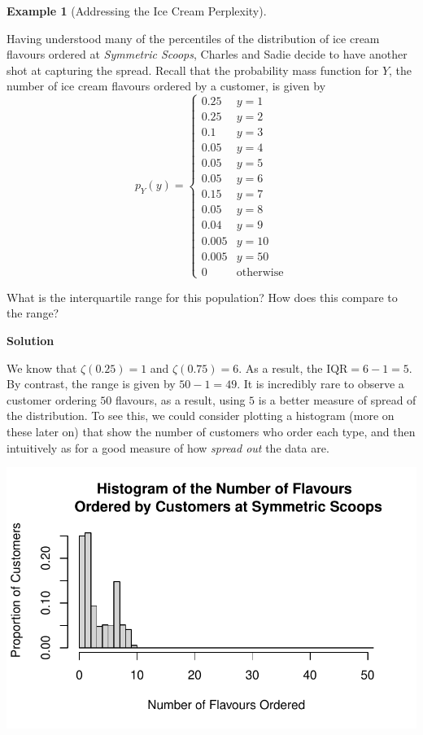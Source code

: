 \documentclass[
  letterpaper,
  DIV=11,
  numbers=noendperiod]{scrreprt}
\theoremstyle{definition}
\theoremstyle{definition}
\newtheorem{example}{Example}[chapter]
\theoremstyle{definition}
\theoremstyle{remark}
\begin{document}
\begin{example}[Addressing the Ice Cream
Perplexity]\protect\hypertarget{exm-percentile}{}\label{exm-percentile}

Having understood many of the percentiles of the distribution of ice
cream flavours ordered at \emph{Symmetric Scoops}, Charles and Sadie
decide to have another shot at capturing the spread. Recall that the
probability mass function for \(Y\), the number of ice cream flavours
ordered by a customer, is given by \[
p_Y(y) = \begin{cases} 
0.25 & y = 1 \\
0.25 & y = 2 \\
0.1 & y = 3 \\
0.05 & y = 4 \\
0.05 & y = 5 \\
0.05 & y = 6 \\
0.15 & y = 7 \\
0.05 & y = 8 \\
0.04 & y = 9 \\
0.005 & y = 10 \\ 
0.005 & y = 50 \\
0 & \text{otherwise}
\end{cases}
\]

What is the interquartile range for this population? How does this
compare to the range?

\begin{tcolorbox}[enhanced jigsaw, colback=white, colframe=quarto-callout-color-frame, arc=.35mm, leftrule=.75mm, rightrule=.15mm, opacityback=0, breakable, bottomrule=.15mm, left=2mm, toprule=.15mm]

\vspace{-3mm}\textbf{Solution}\vspace{3mm}

We know that \(\zeta(0.25) = 1\) and \(\zeta(0.75) = 6\). As a result,
the \(\text{IQR} = 6 - 1 = 5\). By contrast, the range is given by
\(50 - 1 = 49\). It is incredibly rare to observe a customer ordering
\(50\) flavours, as a result, using \(5\) is a better measure of spread
of the distribution. To see this, we could consider plotting a histogram
(more on these later on) that show the number of customers who order
each type, and then intuitively as for a good measure of how
\emph{spread out} the data are.

\includegraphics{notes/chapter6_files/figure-pdf/symmetric_scoops_graph-1.pdf}


\end{tcolorbox}
\end{example}
\end{document}
